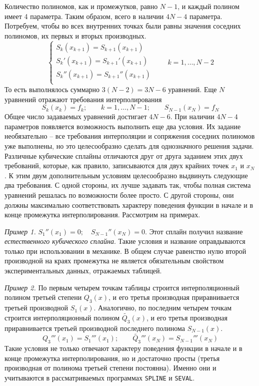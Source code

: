 Количество полиномов, как и промежутков, равно $N - 1$, и каждый полином имеет 4 параметра. Таким образом, всего в
наличии $4N - 4$ параметра. Потребуем, чтобы во всех внутренних точках были равны значения соседних полиномов, их первых
и вторых производных.
\begin{equation*}
    \begin{cases}
        \displaystyle S_k(x_{k+1}) = S_{k+1}(x_{k+1})\\
        S_k'(x_{k+1}) = S_{k+1}'(x_{k+1})\\
        S_k''(x_{k+1}) = S_{k+1}''(x_{k+1})\\
    \end{cases}
    \qquad k = 1,\dots,N-2
\end{equation*}
То есть выполнялось суммарно $3(N-2) = 3N - 6$ уравнений. Еще $N$ уравнений отражают требования интерполирования
\begin{equation*}
    \displaystyle S_k(x_k) = f_k; \qquad k = 1, \dots, N-1; \qquad S_{N-1}(x_N) = f_N
\end{equation*}
Общее число задаваемых уравнений достигает $4N - 6$. При наличии $4N - 4$ параметров появляется возможность выполнить еще
два условия. Их задание необязательно -- все требования интерполяции и сопряжения соседних полиномов уже выполнены, но это
целесообразно сделать для однозначного решения задачи. Различные кубические сплайны отличаются друг от друга заданием
этих двух требований, которые, как правило, записываются для двух крайних точек $x_1 \text{ и } x_N$. К этим двум
дополнительным условиям целесообразно выдвинуть следующие два требования. С одной стороны, их лучше задавать так, чтобы
полная система уравнений решалась по возможности более просто. С другой стороны, они должны максимально соответствовать
характеру поведения функции в начале и в конце промежутка интерполирования. Рассмотрим на примерах.
\vspace{10pt}

\emph{Пример 1.} $\displaystyle S_1''(x_1) = 0; \quad S_{N-1}''(x_N) = 0$. Этот сплайн получил название
\emph{естественного кубического сплайна}. Такие условия и название оправдываются только при использовании в механике.
В общем случае равенство нулю второй производной на краях промежутка не является обязательным свойством
экспериментальных данных, отражаемых таблицей.

\emph{Пример 2.} По первым четырем точкам таблицы строится интерполяционный полином третьей степени $Q_3(x)$, и его
третья производная приравнивается третьей производной $S_1(x)$. Аналогично, по последним четырем точкам строится
интерполяционный полином $\tilde{Q_3}(x)$, и его третья производная приравнивается третьей производной последнего
полинома $S_{N-1}(x)$.
\begin{equation*}
    \displaystyle Q_3'''(x_1) = S_1'''(x_1); \qquad \tilde{Q_3}'''(x_N) = S_{N-1}'''(x_N)
\end{equation*}
Такие условия не только отвечают характеру поведения функции в начале и в конце промежутка интерполирования, но и
достаточно просты (третья производная от полинома третьей степени постоянна). Именно они и учитываются в рассматриваемых
программах \verb|SPLINE| и \verb|SEVAL|.


